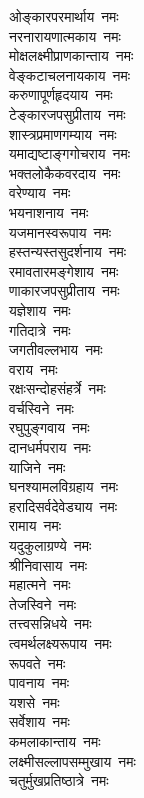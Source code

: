 \begin{multicols}{2}
    \begin{flushleft}
ओङ्कारपरमार्थाय~नमः\\
नरनारायणात्मकाय~नमः\\
मोक्षलक्ष्मीप्राणकान्ताय~नमः\\
वेङ्कटाचलनायकाय~नमः\\
करुणापूर्णहृदयाय~नमः\\
टेङ्कारजपसुप्रीताय~नमः\\
शास्त्रप्रमाणगम्याय~नमः\\
यमाद्यष्टाङ्गगोचराय~नमः\\
भक्तलोकैकवरदाय~नमः\\
वरेण्याय~नमः\hfill{}\\
                                                        
भयनाशनाय~नमः\\
यजमानस्वरूपाय~नमः\\
हस्तन्यस्तसुदर्शनाय~नमः\\
रमावतारमङ्गेशाय~नमः\\
णाकारजपसुप्रीताय~नमः\\
यज्ञेशाय~नमः\\
गतिदात्रे~नमः\\
जगतीवल्लभाय~नमः\\
वराय~नमः\\
रक्षःसन्दोहसंहर्त्रे~नमः\hfill{}\\
                                                        
वर्चस्विने~नमः\\
रघुपुङ्गवाय~नमः\\
दानधर्मपराय~नमः\\
याजिने~नमः\\
घनश्यामलविग्रहाय~नमः\\
हरादिसर्वदेवेड्याय~नमः\\
रामाय~नमः\\
यदुकुलाग्रण्ये~नमः\\
श्रीनिवासाय~नमः\\
महात्मने~नमः\hfill{}\\
                                                        
तेजस्विने~नमः\\
तत्त्वसन्निधये~नमः\\
त्वमर्थलक्ष्यरूपाय~नमः\\
रूपवते~नमः\\
पावनाय~नमः\\
यशसे~नमः\\
सर्वेशाय~नमः\\
कमलाकान्ताय~नमः\\
लक्ष्मीसल्लापसम्मुखाय~नमः\\
चतुर्मुखप्रतिष्ठात्रे~नमः\hfill{}\\
                                                        

\end{flushleft}
\end{multicols}
